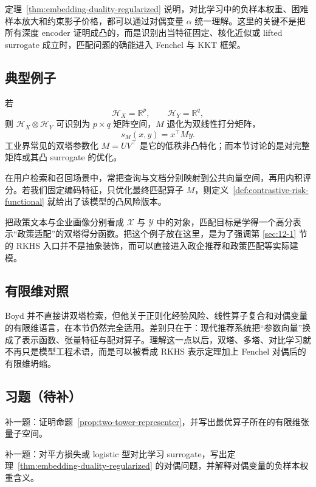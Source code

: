 \begin{remark}
定理~\ref{thm:embedding-duality-regularized} 说明，对比学习中的负样本权重、困难样本放大和约束影子价格，都可以通过对偶变量 $\alpha$ 统一理解。这里的关键不是把所有深度 encoder 证明成凸的，而是识别出当特征固定、核化近似或 lifted surrogate 成立时，匹配问题的确能进入 Fenchel 与 KKT 框架。
\end{remark}

\subsection{典型例子}

\begin{example}[矩阵分解与双线性匹配的有限维坍缩]
若
\[
\mathcal H_X=\mathbb R^p,\qquad \mathcal H_Y=\mathbb R^q,
\]
则 $\mathcal H_X\otimes \mathcal H_Y$ 可识别为 $p\times q$ 矩阵空间，$M$ 退化为双线性打分矩阵，
\[
s_M(x,y)=x^\top My.
\]
工业界常见的双塔参数化 $M=UV^\top$ 是它的低秩非凸特化；而本节讨论的是对完整矩阵或其凸 surrogate 的优化。
\end{example}

\begin{example}[双塔检索的核化解释]
在用户检索和召回场景中，常把查询与文档分别映射到公共向量空间，再用内积评分。若我们固定编码特征，只优化最终匹配算子 $M$，则定义~\ref{def:contrastive-risk-functional} 就给出了该模型的凸风险版本。
\end{example}

\begin{example}[政策--企业匹配]
把政策文本与企业画像分别看成 $\mathcal X$ 与 $\mathcal Y$ 中的对象，匹配目标是学得一个高分表示“政策适配”的双塔得分函数。把这个例子放在这里，是为了强调第 \ref{sec:12-1} 节的 RKHS 入口并不是抽象装饰，而可以直接进入政企推荐和政策匹配等实际建模。
\end{example}

\subsection*{有限维对照}

Boyd 并不直接讲双塔检索，但他关于正则化经验风险、线性算子复合和对偶变量的有限维语言，在本节仍然完全适用。差别只在于：现代推荐系统把“参数向量”换成了表示函数、张量特征与配对算子。理解这一点以后，双塔、多塔、对比学习就不再只是模型工程术语，而是可以被看成 RKHS 表示定理加上 Fenchel 对偶后的有限维坍缩。

\subsection*{习题（待补）}

\begin{exercise}[张量表示定理占位]
补一题：证明命题~\ref{prop:two-tower-representer}，并写出最优算子所在的有限维张量子空间。
\end{exercise}

\begin{exercise}[匹配对偶占位]
补一题：对平方损失或 logistic 型对比学习 surrogate，写出定理~\ref{thm:embedding-duality-regularized} 的对偶问题，并解释对偶变量的负样本权重含义。
\end{exercise}

